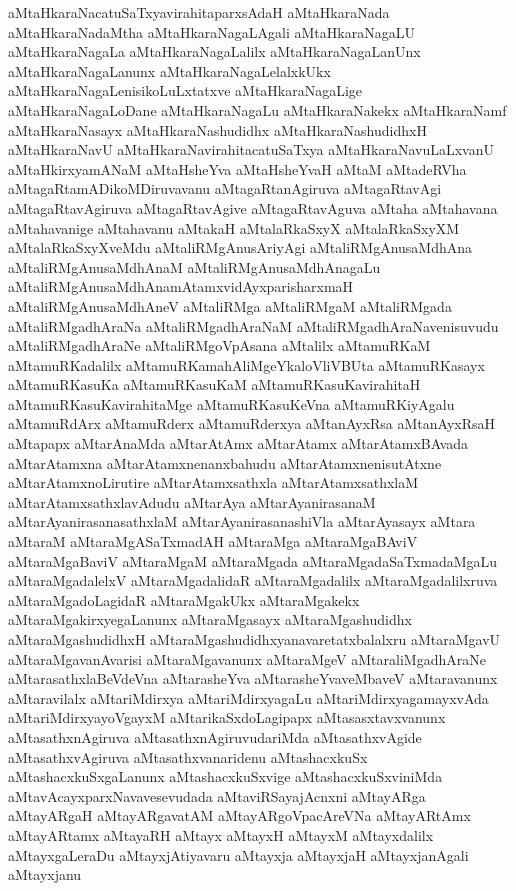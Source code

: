 {aMtaHkaraNacatuSaTxyavirahitaparxsAdaH
aMtaHkaraNada
aMtaHkaraNadaMtha
aMtaHkaraNagaLAgali
aMtaHkaraNagaLU
aMtaHkaraNagaLa
aMtaHkaraNagaLalilx
aMtaHkaraNagaLanUnx
aMtaHkaraNagaLanunx
aMtaHkaraNagaLelalxkUkx
aMtaHkaraNagaLenisikoLuLxtatxve
aMtaHkaraNagaLige
aMtaHkaraNagaLoDane
aMtaHkaraNagaLu
aMtaHkaraNakekx
aMtaHkaraNamf
aMtaHkaraNasayx
aMtaHkaraNashudidhx
aMtaHkaraNashudidhxH
aMtaHkaraNavU
aMtaHkaraNavirahitacatuSaTxya
aMtaHkaraNavuLaLxvanU
aMtaHkirxyamANaM
aMtaHsheYva
aMtaHsheYvaH
aMtaM
aMtadeRVha
aMtagaRtamADikoMDiruvavanu
aMtagaRtanAgiruva
aMtagaRtavAgi
aMtagaRtavAgiruva
aMtagaRtavAgive
aMtagaRtavAguva
aMtaha
aMtahavana
aMtahavanige
aMtahavanu
aMtakaH
aMtalaRkaSxyX
aMtalaRkaSxyXM
aMtalaRkaSxyXveMdu
aMtaliRMgAnusAriyAgi
aMtaliRMgAnusaMdhAna
aMtaliRMgAnusaMdhAnaM
aMtaliRMgAnusaMdhAnagaLu
aMtaliRMgAnusaMdhAnamAtamxvidAyxparisharxmaH
aMtaliRMgAnusaMdhAneV
aMtaliRMga
aMtaliRMgaM
aMtaliRMgada
aMtaliRMgadhAraNa
aMtaliRMgadhAraNaM
aMtaliRMgadhAraNavenisuvudu
aMtaliRMgadhAraNe
aMtaliRMgoVpAsana
aMtalilx
aMtamuRKaM
aMtamuRKadalilx
aMtamuRKamahAliMgeYkaloVliVBUta
aMtamuRKasayx
aMtamuRKasuKa
aMtamuRKasuKaM
aMtamuRKasuKavirahitaH
aMtamuRKasuKavirahitaMge
aMtamuRKasuKeVna
aMtamuRKiyAgalu
aMtamuRdArx
aMtamuRderx
aMtamuRderxya
aMtanAyxRsa
aMtanAyxRsaH
aMtapapx
aMtarAnaMda
aMtarAtAmx
aMtarAtamx
aMtarAtamxBAvada
aMtarAtamxna
aMtarAtamxnenanxbahudu
aMtarAtamxnenisutAtxne
aMtarAtamxnoLirutire
aMtarAtamxsathxla
aMtarAtamxsathxlaM
aMtarAtamxsathxlavAdudu
aMtarAya
aMtarAyanirasanaM
aMtarAyanirasanasathxlaM
aMtarAyanirasanashiVla
aMtarAyasayx
aMtara
aMtaraM
aMtaraMgASaTxmadAH
aMtaraMga
aMtaraMgaBAviV
aMtaraMgaBaviV
aMtaraMgaM
aMtaraMgada
aMtaraMgadaSaTxmadaMgaLu
aMtaraMgadalelxV
aMtaraMgadalidaR
aMtaraMgadalilx
aMtaraMgadalilxruva
aMtaraMgadoLagidaR
aMtaraMgakUkx
aMtaraMgakekx
aMtaraMgakirxyegaLanunx
aMtaraMgasayx
aMtaraMgashudidhx
aMtaraMgashudidhxH
aMtaraMgashudidhxyanavaretatxbalalxru
aMtaraMgavU
aMtaraMgavanAvarisi
aMtaraMgavanunx
aMtaraMgeV
aMtaraliMgadhAraNe
aMtarasathxlaBeVdeVna
aMtarasheYva
aMtarasheYvaveMbaveV
aMtaravanunx
aMtaravilalx
aMtariMdirxya
aMtariMdirxyagaLu
aMtariMdirxyagamayxvAda
aMtariMdirxyayoVgayxM
aMtarikaSxdoLagipapx
aMtasasxtavxvanunx
aMtasathxnAgiruva
aMtasathxnAgiruvudariMda
aMtasathxvAgide
aMtasathxvAgiruva
aMtasathxvanaridenu
aMtashacxkuSx
aMtashacxkuSxgaLanunx
aMtashacxkuSxvige
aMtashacxkuSxviniMda
aMtavAcayxparxNavavesevudada
aMtaviRSayajAcnxni
aMtayARga
aMtayARgaH
aMtayARgavatAM
aMtayARgoVpacAreVNa
aMtayARtAmx
aMtayARtamx
aMtayaRH
aMtayx
aMtayxH
aMtayxM
aMtayxdalilx
aMtayxgaLeraDu
aMtayxjAtiyavaru
aMtayxja
aMtayxjaH
aMtayxjanAgali
aMtayxjanu
}
